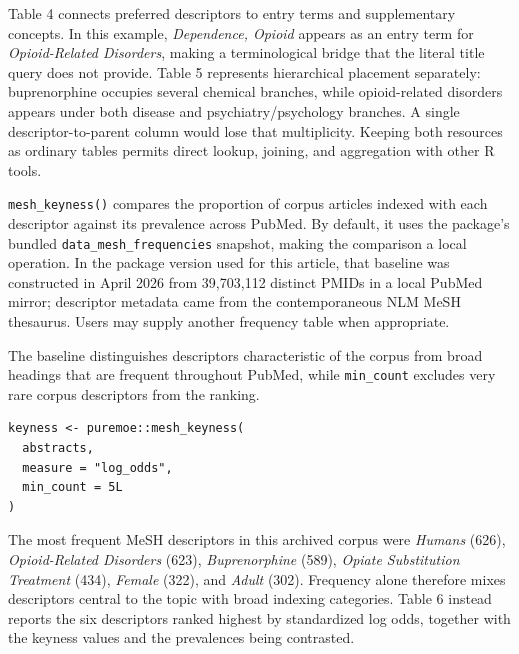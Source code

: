 Table 4 connects preferred descriptors to entry terms and supplementary
concepts. In this example, \emph{Dependence, Opioid} appears as an entry term for
\emph{Opioid-Related Disorders}, making a terminological bridge that the literal
title query does not provide. Table 5 represents hierarchical placement
separately: buprenorphine occupies several chemical branches, while
opioid-related disorders appears under both disease and psychiatry/psychology
branches. A single descriptor-to-parent column would lose that multiplicity.
Keeping both resources as ordinary tables permits direct lookup, joining, and
aggregation with other R tools.

\texttt{mesh\_keyness()} compares the proportion of corpus articles indexed with each
descriptor against its prevalence across PubMed. By default, it uses the
package's bundled \texttt{data\_mesh\_frequencies} snapshot, making the comparison a
local operation. In the package version used for this article, that baseline
was constructed in April 2026
from 39,703,112 distinct PMIDs in a local PubMed mirror; descriptor metadata
came from the contemporaneous NLM MeSH thesaurus. Users may supply another
frequency table when appropriate.

The baseline distinguishes descriptors characteristic of the corpus from broad
headings that are frequent throughout PubMed, while \texttt{min\_count} excludes very
rare corpus descriptors from the ranking.

\begin{verbatim}
keyness <- puremoe::mesh_keyness(
  abstracts,
  measure = "log_odds",
  min_count = 5L
)
\end{verbatim}

The most frequent MeSH descriptors in this archived corpus were
\emph{Humans} (626), \emph{Opioid-Related Disorders} (623), \emph{Buprenorphine} (589), \emph{Opiate Substitution Treatment} (434), \emph{Female} (322), and \emph{Adult} (302). Frequency alone therefore mixes descriptors central to
the topic with broad indexing categories. Table 6 instead reports the six
descriptors ranked highest by standardized log odds, together with the keyness
values and the prevalences being contrasted.

